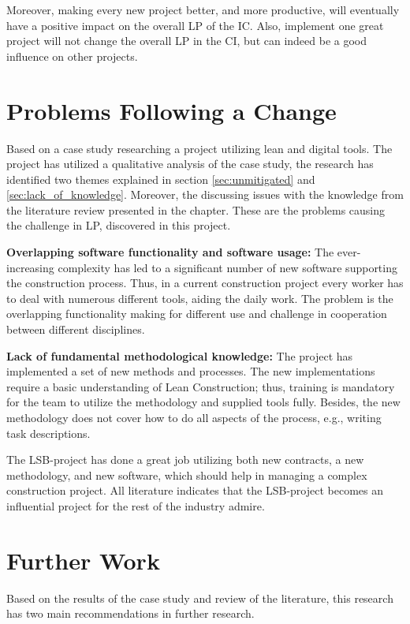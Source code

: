 Moreover, making every new project better, and more productive, will eventually have a positive impact on the overall LP of the IC. Also, implement one great project will not change the overall LP in the CI, but can indeed be a good influence on other projects.

\section{Problems Following a Change} \label{sec:rq2}
Based on a case study researching a project utilizing lean and digital tools. The project has utilized a qualitative analysis of the case study, the research has identified two themes explained in section \ref{sec:unmitigated} and \ref{sec:lack_of_knowledge}. Moreover, the discussing issues with the knowledge from the literature review presented in the  chapter. These are the problems causing the challenge in LP, discovered in this project.
    
{\bf Overlapping software functionality and software usage:} The ever-increasing complexity has led to a significant number of new software supporting the construction process. Thus, in a current construction project every worker has to deal with numerous different tools, aiding the daily work. The problem is the overlapping functionality making for different use and challenge in cooperation between different disciplines.
    
{\bf Lack of fundamental methodological knowledge:} The project has implemented a set of new methods and processes. The new implementations require a basic understanding of Lean Construction; thus, training is mandatory for the team to utilize the methodology and supplied tools fully. Besides, the new methodology does not cover how to do all aspects of the process, e.g., writing task descriptions.

The LSB-project has done a great job utilizing both new contracts, a new methodology, and new software, which should help in managing a complex construction project. All literature indicates that the LSB-project becomes an influential project for the rest of the industry admire.

\section{Further Work} \label{sec:further_research}
Based on the results of the case study and review of the literature, this research has two main recommendations in further research.

